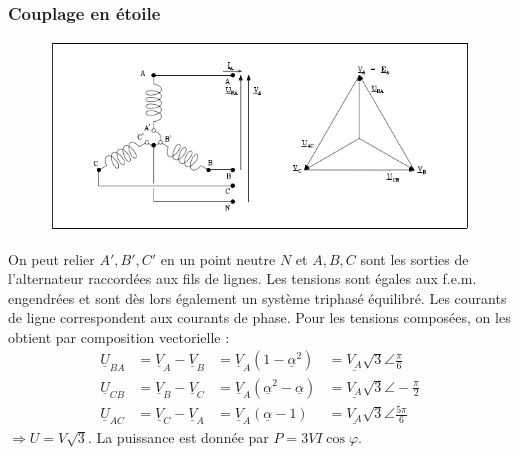 \subsubsection{Couplage en étoile}
\begin{figure}
	\vspace{-5mm}
	\includegraphics[scale=0.4]{ch1/image9.png}
\end{figure}
On peut relier $A',B',C'$ en un point neutre $N$ et $A,B,C$ sont les 
sorties de l'alternateur raccordées aux fils de lignes. Les tensions 
sont égales aux f.e.m. engendrées et sont dès lors également un 
système triphasé équilibré. Les courants de ligne correspondent aux courants de phase. Pour les tensions composées, on les 
obtient par composition vectorielle :
\vspace{1cm}
\begin{equation}
	\begin{array}{llll}
		\underline{U}_{BA} & = \underline{V}_A-\underline{V}_B & = \underline{V}_A 
		(1-\underline{\alpha}^2) &= \underline{V_A}\sqrt{3}\angle\frac{\pi}{6}\\
		\underline{U}_{CB} & = \underline{V}_B-\underline{V}_C & = \underline{V}_A 
		(\underline{\alpha}^2-\underline{\alpha}) &= \underline{V_A}\sqrt{3}\angle
		-\frac{\pi}{2}		\\
		\underline{U}_{AC} & = \underline{V}_C-\underline{V}_A & = \underline{V}_A 
		(\underline{\alpha}-1) &= \underline{V_A}\sqrt{3}\angle\frac{5\pi}{6}
	\end{array}
\end{equation}
$\Longrightarrow U = V\sqrt{3}$. La puissance est donnée par $P = 3VI
\cos\varphi$.
		
